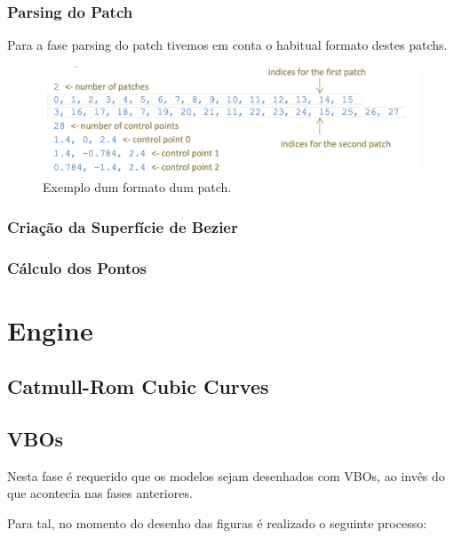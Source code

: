 \documentclass[a4paper]{article}
\begin{document}
\subsubsection{Parsing do Patch}

Para a fase parsing do patch tivemos em conta o habitual formato destes patchs.

\begin{figure}[H]
\centering
\includegraphics[scale=0.75]{patch_format.png}
\caption{Exemplo dum formato dum patch.}
\label{img:bezier_command}
\end{figure}

\subsubsection{Criação da Superfície de Bezier}

\subsubsection{Cálculo dos Pontos}



\section{Engine}
\label{sec:engine}

\subsection{Catmull-Rom Cubic Curves}
\label{sec:catmullrom}


\newpage

\subsection{VBOs}
\label{sec:vbos}

Nesta fase é requerido que os modelos sejam desenhados com VBOs, ao invês do que acontecia nas fases anteriores.

Para tal, no momento do desenho das figuras é realizado o seguinte processo:
\end{document}
